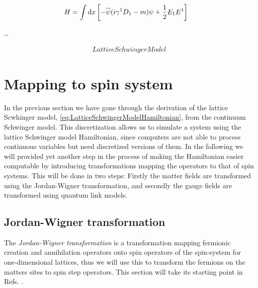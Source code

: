 \documentclass[../main.tex]{subfiles} %
\begin{document}

\begin{align}
    H &= \int \dd{x} \left[ - \overline{\psi} (i \gamma^1 D_1 - m) \psi + \frac{1}{2} E_1 E^1 \right]
\end{align}

\ldots

\begin{align} \label{eq:LatticeSchwingerModelHamiltonian}
    LatticeSchwingerModel
\end{align}



\section{Mapping to spin system}

In the previous section we have gone through the derivation of the lattice Scwhinger model, \cref{eq:LatticeSchwingerModelHamiltonian}, from the continuum Schwinger model. This discretization allows us to simulate a system using the lattice Schwinger model Hamiltonian, since computers are not able to process continuous variables but need discretized versions of them. In the following we will provided yet another step in the process of making the Hamiltonian easier computable by introducing transformations mapping the operators to that of spin systems. This will be done in two steps: Firstly the matter fields are transformed using the Jordan-Wigner transformation, and secondly the gauge fields are transformed using quantum link models.



\subsection{Jordan-Wigner transformation}

The \emph{Jordan-Wigner transformation} is a transformation mapping fermionic creation and annihilation operators onto spin operators of the spin-\half system for one-dimensional lattices, thus we will use this to transform the fermions on the matters sites to spin step operators. This section will take its starting point in Refs. \cite{jordan-wigner_1928, banksSusskindKogut_StrongCoupling_1976, panyella_masterThesis_2019}.
\end{document}
